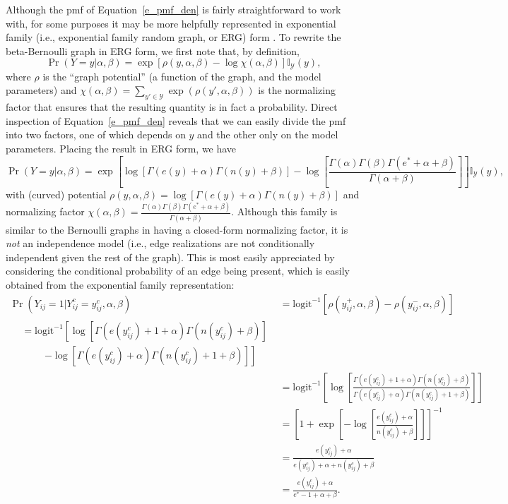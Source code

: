 \documentclass[11pt]{article}
\newcommand{\ilogit}{\ensuremath{\mathrm{logit}^{-1}}\xspace}
\begin{document}
Although the pmf of Equation~\ref{e_pmf_den} is fairly straightforward to work with, for some purposes it may be more helpfully represented in exponential family (i.e., exponential family random graph, or ERG) form \citep{holland.leinhardt:jasa:1981,frank.strauss:jasa:1986}.  To rewrite the beta-Bernoulli graph in ERG form, we first note that, by definition,
\[
\Pr(Y=y|\alpha,\beta) = \exp\left[ \rho(y,\alpha,\beta) - \log \chi(\alpha,\beta) \right] \mathbb{I}_\mathcal{Y}(y),
\]
where $\rho$ is the ``graph potential'' (a function of the graph, and the model parameters) and $\chi(\alpha,\beta)=\sum_{y'\in \mathcal{Y}}\exp(\rho(y',\alpha,\beta))$ is the normalizing factor that ensures that the resulting quantity is in fact a probability.  Direct inspection of Equation~\ref{e_pmf_den} reveals that we can easily divide the pmf into two factors, one of which depends on $y$ and the other only on the model parameters.  Placing the result in ERG form, we have
\begin{equation}
\Pr(Y=y|\alpha,\beta) = \exp\left[\log\left[\Gamma(e(y)+\alpha) \Gamma(n(y)+\beta)\right] - \log\left[\frac{\Gamma(\alpha) \Gamma(\beta)\Gamma(e^*+\alpha+\beta)}{\Gamma(\alpha+\beta)}\right]\right] \mathbb{I}_\mathcal{Y}(y), \label{e_pmf_den_erg}
\end{equation}
with (curved) potential $\rho(y,\alpha,\beta)=\log\left[\Gamma(e(y)+\alpha) \Gamma(n(y)+\beta)\right]$ and normalizing factor \break$\chi(\alpha,\beta)=\frac{\Gamma(\alpha) \Gamma(\beta)\Gamma(e^*+\alpha+\beta)}{\Gamma(\alpha+\beta)}$.  Although this family is similar to the Bernoulli graphs in having a closed-form normalizing factor, it is \emph{not} an independence model (i.e., edge realizations are not conditionally independent given the rest of the graph).  This is most easily appreciated by considering the conditional probability of an edge being present, which is easily obtained from the exponential family representation:
\begin{align}
\Pr(Y_{ij}=1|Y^c_{ij}=y^c_{ij},\alpha,\beta) &= \ilogit\left[\rho\left(y^+_{ij},\alpha,\beta\right)-\rho\left(y^-_{ij},\alpha,\beta\right)\right]  \nonumber\\
\begin{split}
&=\ilogit\left[ \log\left[\Gamma(e(y^c_{ij})+1+\alpha) \Gamma(n(y^c_{ij})+\beta)\right] \right.\\
& \phantom{=}\quad \left. - \log\left[\Gamma(e(y^c_{ij})+\alpha) \Gamma(n(y^c_{ij})+1+\beta)\right] \right]
\end{split} \nonumber\\
&=\ilogit\left[ \log\left[\frac{\Gamma(e(y^c_{ij})+1+\alpha) \Gamma(n(y^c_{ij})+\beta)}{\Gamma(e(y^c_{ij})+\alpha) \Gamma(n(y^c_{ij})+1+\beta)}\right]  \right] \nonumber\\
&=\left[1+ \exp\left[-\log\left[\frac{e(y^c_{ij})+\alpha }{n(y^c_{ij})+\beta}\right] \right] \right]^{-1} \nonumber\\
&=\frac{e(y^c_{ij})+\alpha}{e(y^c_{ij})+\alpha+n(y^c_{ij})+\beta} \nonumber\\
&=\frac{e(y^c_{ij})+\alpha}{e^*-1+\alpha+\beta}.\label{e_confprob_den}
\end{align}
\end{document}
